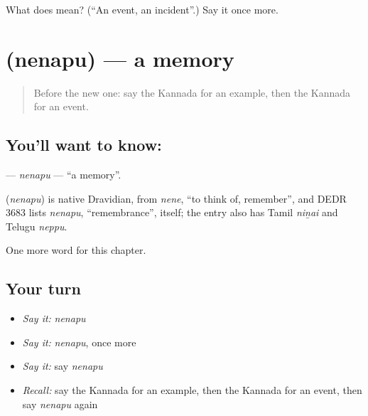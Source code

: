 \begin{tcolorbox}[breakable,colback=teal!4,colframe=teal!35!black,title={Before you move on}]
What does  mean? (\textquotedblleft{}An event, an incident\textquotedblright{}.) Say it once more.
\end{tcolorbox}
\section[\texorpdfstring{\kn{ನೆನಪು} (nenapu)}{ನೆನಪು (nenapu)}]{ (nenapu) — a memory}

\label{lesson:KA-C253-nenapu}



\begin{quote}
Before the new one: say the Kannada for an example, then the Kannada for an event.
\end{quote}

\subsection*{You'll want to know: }
\textbf{} — \emph{nenapu} — \textquotedblleft{}a memory\textquotedblright{}.

\begin{cousinweb}
\textbf{} (\emph{nenapu}) is native Dravidian, from \emph{nene}, \textquotedblleft{}to think of, remember\textquotedblright{}, and DEDR 3683 lists \emph{nenapu}, \textquotedblleft{}remembrance\textquotedblright{}, itself; the entry also has Tamil \emph{niṉai} and Telugu \emph{neppu}.
\end{cousinweb}

\begin{grammarlens}[title={What you've built}]
One more word for this chapter.
\end{grammarlens}

\subsection*{Your turn}
\begin{itemize}
\raggedright
  \item \emph{Say it:} \emph{nenapu}
  \item \emph{Say it:} \emph{nenapu}, once more
  \item \emph{Say it:} say \emph{nenapu}
  \item \emph{Recall:} say the Kannada for an example, then the Kannada for an event, then say \emph{nenapu} again
\end{itemize}

